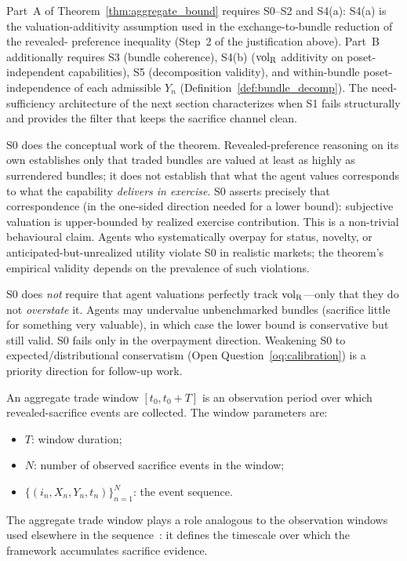 Part~A of Theorem~\ref{thm:aggregate_bound} requires
S0--S2 and S4(a): S4(a) is the valuation-additivity assumption
used in the exchange-to-bundle reduction of the revealed-
preference inequality (Step~2 of the justification above).
Part~B additionally requires S3 (bundle coherence), S4(b)
(${\operatorname{vol}_{\mathrm{R}}}$ additivity on poset-independent capabilities), S5
(decomposition validity), and within-bundle poset-independence
of each admissible $Y_n$ (Definition~\ref{def:bundle_decomp}).
The need-sufficiency architecture of the next section
characterizes when S1 fails structurally and provides the filter
that keeps the sacrifice channel clean.

\begin{remark}
\label{rem:s0_substantive}
S0 does the conceptual work of the theorem.  Revealed-preference
reasoning on its own establishes only that traded bundles are
valued at least as highly as surrendered bundles; it does not
establish that what the agent values corresponds to what the
capability \emph{delivers in exercise}.  S0 asserts precisely
that correspondence (in the one-sided direction needed for a
lower bound): subjective valuation is upper-bounded by realized
exercise contribution.  This is a non-trivial behavioural claim.
Agents who systematically overpay for status, novelty, or
anticipated-but-unrealized utility violate S0 in realistic
markets; the theorem's empirical validity depends on the
prevalence of such violations.

S0 does \emph{not} require that agent valuations perfectly track
${\operatorname{vol}_{\mathrm{R}}}$---only that they do not \emph{overstate} it.  Agents may
undervalue unbenchmarked bundles (sacrifice little for something
very valuable), in which case the lower bound is conservative
but still valid.  S0 fails only in the overpayment direction.
Weakening S0 to expected/distributional conservatism
(Open Question~\ref{oq:calibration}) is a priority direction for
follow-up work.
\end{remark}

\begin{definition}
\label{def:trade_window}
An aggregate trade window $[t_0, t_0 + T]$ is an observation
period over which revealed-sacrifice events are collected.  The
window parameters are:
\begin{itemize}
\item $T$: window duration;
\item $N$: number of observed sacrifice events in the window;
\item $\{(i_n, X_n, Y_n, t_n)\}_{n=1}^N$: the event sequence.
\end{itemize}
The aggregate trade window plays a role analogous to the
observation windows used elsewhere in the
sequence~\citep{lasser2026scm}: it defines the timescale
over which the framework accumulates sacrifice evidence.
\end{definition}

